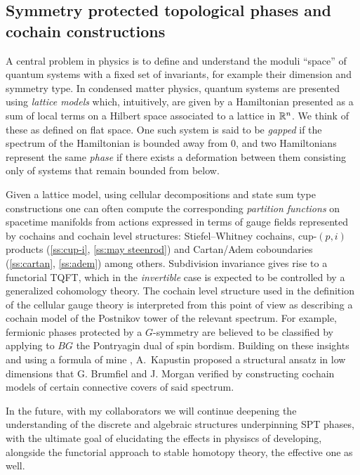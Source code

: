\subsection{Symmetry protected topological phases and cochain constructions} \label{ss:spt phases}

A central problem in physics is to define and understand the moduli ``space'' of quantum systems with a fixed set of invariants, for example their dimension and symmetry type.
In condensed matter physics, quantum systems are presented using \textit{lattice models} which, intuitively, are given by a Hamiltonian presented as a sum of local terms on a Hilbert space associated to a lattice in $\mathbb{R}^n$.
We think of these as defined on flat space.
One such system is said to be \textit{gapped} if the spectrum of the Hamiltonian is bounded away from $0$, and two Hamiltonians represent the same \textit{phase} if there exists a deformation between them consisting only of systems that remain bounded from below.

Given a lattice model, using cellular decompositions and state sum type constructions one can often compute the corresponding \textit{partition functions} on spacetime manifolds from actions expressed in terms of gauge fields represented by cochains and cochain level structures: Stiefel--Whitney cochains, cup-$(p, i)$ products (\cref{ss:cup-i}, \cref{ss:may steenrod}) and Cartan/Adem coboundaries (\cref{ss:cartan}, \cref{ss:adem}) among others.
Subdivision invariance gives rise to a functorial TQFT, which in the \textit{invertible} case is expected to be controlled by a generalized cohomology theory.
The cochain level structure used in the definition of the cellular gauge theory is interpreted from this point of view as describing a cochain model of the Postnikov tower of the relevant spectrum.
For example, fermionic phases protected by a $G$-symmetry are believed to be classified by applying to $BG$ the Pontryagin dual of spin bordism.
Building on these insights and using a formula of mine \cite{medina2020cartan}, A.~Kapustin proposed a structural ansatz in low dimensions that G. Brumfiel and J. Morgan verified by constructing cochain models of certain connective covers of said spectrum.

In the future, with my collaborators we will continue deepening the understanding of the discrete and algebraic structures underpinning SPT phases, with the ultimate goal of elucidating the effects in physiscs of developing, alongside the functorial approach to stable homotopy theory, the effective one as well.


